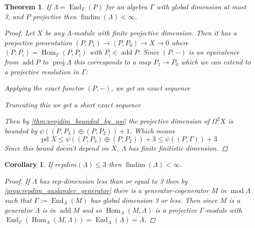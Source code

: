 \documentclass[11pt, a4paper, english]{article}
\newtheorem{theorem}{Theorem}[section]
\newtheorem{cor}{Corollary}[theorem]
\theoremstyle{definition}
\DeclareMathOperator{\Hom}{Hom}
\DeclareMathOperator{\End}{End}
\DeclareMathOperator{\findim}{findim}
\DeclareMathOperator{\proj}{proj}
\DeclareMathOperator{\pd}{pd}
\DeclareMathOperator{\add}{add}
\def\mod{\operatorname{mod}}
\begin{document}
\begin{theorem}\cite[Corollary~8]{IgTo05}
	If $\Lambda = \End_\Gamma(P)$ for an algebra $\Gamma$ with global dimension at most 3, and $P$ projective then $\findim(\Lambda) < \infty$.
	\begin{proof}
		Let $X$ be any $\Lambda$-module with finite projective dimension. Then it has a projective presentation $(P, P_1) \to (P,P_0) \to X \to 0$ where $(P,P_i)=\Hom_\Gamma(P,P_i)$ with $P_i \in \add P$. Since $(P,-)$ is an equivalence from $\add P$ to $\proj\Lambda$ this corresponds to a map $P_1 \to P_0$ which we can extend to a projective resolution in $\Gamma$:
		\begin{center}
		\end{center}
		Applying the exact functor $(P, -)$, we get an exact sequence
		\begin{center}
		\end{center}
		Truncating this we get a short exact sequence
		\begin{center}
		\end{center}
		Then by \cref{thm:projdim_bounded_by_psi} the projective dimension of $\Omega^2 X$ is bounded by $\psi((P, P_3)\oplus (P, P_2))+1$. Which means
		$$\pd X \leq \psi((P, P_3)\oplus (P, P_2))+3 \leq \psi((P,\Gamma))+3$$
		Since this bound doesn't depend on $X$, $\Lambda$ has finite finitistic dimension.
	\end{proof} 
\end{theorem}

\begin{cor}
	If $repdim(\Lambda) \leq 3$ then $\findim(\Lambda) < \infty$.
	\begin{proof}
		If $\Lambda$ has rep-dimension less than or equal to 3 then by \cref{prop:repdim_auslander_generator} there is a generator-cogenerator $M$ in $\mod\Lambda$ such that $\Gamma := \End_\Lambda(M)$ has global dimension 3 or less. Then since $M$ is a generator $\Lambda$ is in $\add M$ and so $\Hom_\Lambda(M, \Lambda)$ is a projective $\Gamma$-module with $\End_\Gamma(\Hom_\Lambda(M, \Lambda)) = \End_\Lambda(\Lambda) = \Lambda$.
	\end{proof}
\end{cor}
\end{document}
